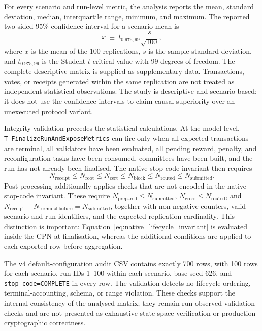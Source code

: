 \documentclass[a4paper,fleqn]{cas-sc}
\begin{document}
For every scenario and run-level metric, the analysis reports the mean,
standard deviation, median, interquartile range, minimum, and maximum. The
reported two-sided 95\% confidence interval for a scenario mean is
\begin{equation}
\bar{x}\;\pm\;t_{0.975,99}\frac{s}{\sqrt{100}},
\label{eq:t_confidence_interval}
\end{equation}
where $\bar{x}$ is the mean of the 100 replications, $s$ is the sample standard
deviation, and $t_{0.975,99}$ is the Student-$t$ critical value with 99 degrees
of freedom. The complete descriptive matrix is supplied as supplementary data.
Transactions, votes, or receipts generated within the same replication are not
treated as independent statistical observations. The study is descriptive and
scenario-based; it does not use the confidence intervals to claim causal
superiority over an unexecuted protocol variant.

Integrity validation precedes the statistical calculations. At the
model level, \texttt{T\_FinalizeRunAnd}\hspace{0pt}\texttt{ExposeMetrics} can fire only when all
expected transactions are terminal, all validators have been evaluated, all
pending reward, penalty, and reconfiguration tasks have been consumed,
committees have been built, and the run has not already been finalised. The
native stop-code invariant then requires
\begin{equation}
N_{\mathrm{receipt}}
\leq N_{\mathrm{root}}
\leq N_{\mathrm{cert}}
\leq N_{\mathrm{block}}
\leq N_{\mathrm{routed}}
\leq N_{\mathrm{submitted}}.
\label{eq:native_lifecycle_invariant}
\end{equation}
Post-processing additionally applies checks that are not encoded in the native
stop-code invariant. These require
$N_{\mathrm{prepared}}\leq N_{\mathrm{submitted}}$,
$N_{\mathrm{cross}}\leq N_{\mathrm{routed}}$, and
$N_{\mathrm{receipt}}+N_{\mathrm{terminal\ failure}}=
N_{\mathrm{submitted}}$, together with non-negative counters, valid scenario and
run identifiers, and the expected replication cardinality. This distinction is
important: Equation~\eqref{eq:native_lifecycle_invariant} is evaluated inside
the CPN at finalisation, whereas the additional conditions are applied to each
exported row before aggregation.

The v4 default-configuration audit CSV contains exactly 700 rows, with 100 rows for each
scenario, run IDs 1--100 within each scenario, base seed 626, and
\texttt{stop\_code=COMPLETE} in every row. The validation detects no lifecycle-ordering, terminal-accounting, schema, or
range violation. These checks
support the internal consistency of the analysed matrix; they remain
run-observed validation checks and are not presented as exhaustive state-space
verification or production cryptographic correctness.
\end{document}
